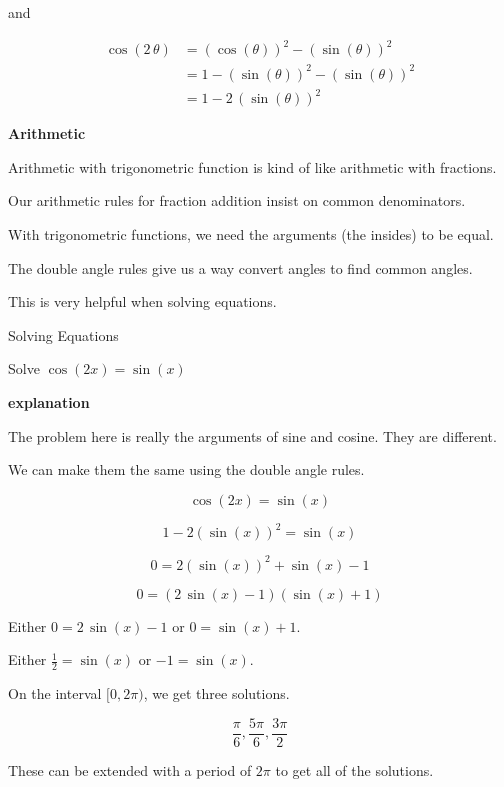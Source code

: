 \documentclass{ximera}
\begin{document}
and


\begin{align*}
\cos(2 \, \theta) & = (\cos(\theta))^2 - (\sin(\theta))^2 \\
& = 1 - (\sin(\theta))^2 - (\sin(\theta))^2  \\
& = 1 - 2 \, (\sin(\theta))^2
\end{align*}


\textbf{\textcolor{blue!55!black}{Arithmetic}} 

Arithmetic with trigonometric function is kind of like arithmetic with fractions.  

Our arithmetic rules for fraction addition insist on common denominators.

With trigonometric functions, we need the arguments (the insides) to be equal.


The double angle rules give us a way convert angles to find common angles.

This is very helpful when solving equations.




\begin{example} Solving Equations


Solve $\cos(2x) = \sin(x)$

\textbf{\textcolor{red!75!green}{explanation}} 


The problem here is really the arguments of sine and cosine.  They are different.

We can make them the same using the double angle rules.


\[  \cos(2x) = \sin(x)  \]

\[  1 - 2(\sin(x))^2 = \sin(x)  \]

\[  0 = 2(\sin(x))^2 + \sin(x) - 1  \]

\[  0 = (2 \, \sin(x) - 1) (\sin(x) + 1)  \]


Either $0 = 2 \, \sin(x) - 1$ or $0 = \sin(x) + 1$.

Either $\frac{1}{2} = \sin(x) $ or $-1 = \sin(x)$.


On the interval $[0, 2\pi)$, we get three solutions.


\[ \frac{\pi}{6}, \frac{5\pi}{6}, \frac{3\pi}{2}  \]


These can be extended with a period of $2\pi$ to get all of the solutions.



\end{example}
\end{document}
